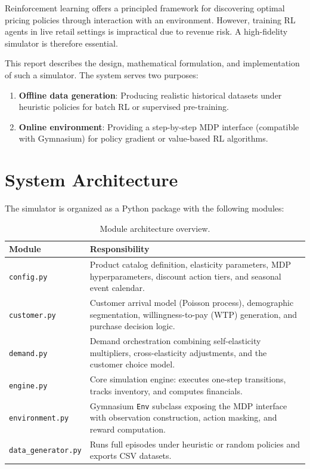 \documentclass[11pt,a4paper]{article}
\begin{document}
Reinforcement learning offers a principled framework for discovering optimal pricing policies through interaction with an environment.
However, training RL agents in live retail settings is impractical due to revenue risk.
A high-fidelity simulator is therefore essential.

This report describes the design, mathematical formulation, and implementation of such a simulator.
The system serves two purposes:
\begin{enumerate}[label=(\roman*)]
    \item \textbf{Offline data generation}: Producing realistic historical datasets under heuristic policies for batch RL or supervised pre-training.
    \item \textbf{Online environment}: Providing a step-by-step MDP interface (compatible with Gymnasium) for policy gradient or value-based RL algorithms.
\end{enumerate}

\section{System Architecture}

The simulator is organized as a Python package with the following modules:

\begin{table}[H]
\centering
\caption{Module architecture overview.}
\begin{tabular}{@{}lp{9cm}@{}}
\toprule
\textbf{Module} & \textbf{Responsibility} \\
\midrule
\texttt{config.py} & Product catalog definition, elasticity parameters, MDP hyperparameters, discount action tiers, and seasonal event calendar. \\
\texttt{customer.py} & Customer arrival model (Poisson process), demographic segmentation, willingness-to-pay (WTP) generation, and purchase decision logic. \\
\texttt{demand.py} & Demand orchestration combining self-elasticity multipliers, cross-elasticity adjustments, and the customer choice model. \\
\texttt{engine.py} & Core simulation engine: executes one-step transitions, tracks inventory, and computes financials. \\
\texttt{environment.py} & Gymnasium \texttt{Env} subclass exposing the MDP interface with observation construction, action masking, and reward computation. \\
\texttt{data\_generator.py} & Runs full episodes under heuristic or random policies and exports CSV datasets. \\
\bottomrule
\end{tabular}
\end{table}
\end{document}
